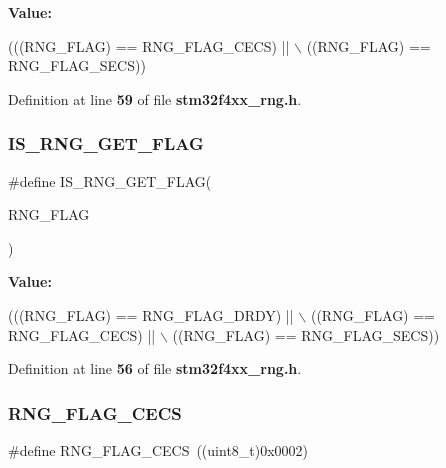 {\bfseries Value\+:}
\begin{DoxyCode}
(((RNG\_FLAG) == RNG_FLAG_CECS) || \(\backslash\)
                                    ((RNG\_FLAG) == RNG_FLAG_SECS))
\end{DoxyCode}


Definition at line \textbf{ 59} of file \textbf{ stm32f4xx\+\_\+rng.\+h}.

\mbox{\label{group__RNG__flags__definition_ga476bc65e9df40bd28870c6722b0989cc}} 
\subsubsection{I\+S\+\_\+\+R\+N\+G\+\_\+\+G\+E\+T\+\_\+\+F\+L\+AG}
{\footnotesize\ttfamily \#define I\+S\+\_\+\+R\+N\+G\+\_\+\+G\+E\+T\+\_\+\+F\+L\+AG(\begin{DoxyParamCaption}\item[{}]{R\+N\+G\+\_\+\+F\+L\+AG }\end{DoxyParamCaption})}

{\bfseries Value\+:}
\begin{DoxyCode}
(((RNG\_FLAG) == RNG_FLAG_DRDY) || \(\backslash\)
                                   ((RNG\_FLAG) == RNG_FLAG_CECS) || \(\backslash\)
                                   ((RNG\_FLAG) == RNG_FLAG_SECS))
\end{DoxyCode}


Definition at line \textbf{ 56} of file \textbf{ stm32f4xx\+\_\+rng.\+h}.

\mbox{\label{group__RNG__flags__definition_ga4d4d7142b6c50bf0f421a1b668b3ff42}} 
\subsubsection{R\+N\+G\+\_\+\+F\+L\+A\+G\+\_\+\+C\+E\+CS}
{\footnotesize\ttfamily \#define R\+N\+G\+\_\+\+F\+L\+A\+G\+\_\+\+C\+E\+CS~((uint8\+\_\+t)0x0002)}

